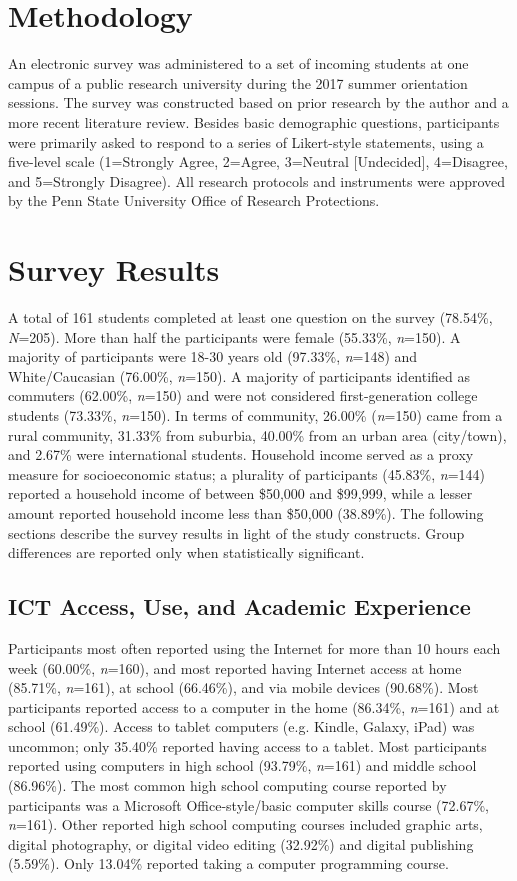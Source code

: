 \documentclass{article}
\begin{document}
\section{Methodology}
An electronic survey was administered to a set of incoming students at one campus of a public research university during the 2017 summer orientation sessions. The survey was constructed based on prior research by the author \cite{stone2010factors} and a more recent literature review. Besides basic demographic questions, participants were primarily asked to respond to a series of Likert-style statements, using a five-level scale (1=Strongly Agree, 2=Agree, 3=Neutral [Undecided], 4=Disagree, and 5=Strongly Disagree). All research protocols and instruments were approved by the Penn State University Office of Research Protections.

\section{Survey Results}
A total of 161 students completed at least one question on the survey (78.54\%, \textit{N}=205). More than half the participants were female (55.33\%, \textit{n}=150). A majority of participants were 18-30 years old (97.33\%, \textit{n}=148) and White/Caucasian (76.00\%, \textit{n}=150). A majority of participants identified as commuters (62.00\%, \textit{n}=150) and were not considered first-generation college students (73.33\%, \textit{n}=150). In terms of community, 26.00\% (\textit{n}=150) came from a rural community, 31.33\% from suburbia, 40.00\% from an urban area (city/town), and 2.67\% were international students. Household income served as a proxy measure for socioeconomic status; a plurality of participants (45.83\%, \textit{n}=144) reported a household income of between \$50,000 and \$99,999, while a lesser amount reported household income less than \$50,000 (38.89\%). The following sections describe the survey results in light of the study constructs. Group differences are reported only when statistically significant.

\subsection{ICT Access, Use, and Academic Experience}
Participants most often reported using the Internet for more than 10 hours each week (60.00\%, \textit{n}=160), and most reported having Internet access at home (85.71\%, \textit{n}=161), at school (66.46\%), and via mobile devices (90.68\%). Most participants reported access to a computer in the home (86.34\%, \textit{n}=161) and at school (61.49\%). Access to tablet computers (e.g. Kindle, Galaxy, iPad) was uncommon; only 35.40\% reported having access to a tablet. Most participants reported using computers in high school (93.79\%, \textit{n}=161) and middle school (86.96\%). The most common high school computing course reported by participants was a Microsoft Office-style/basic computer skills course (72.67\%, \textit{n}=161). Other reported high school computing courses included graphic arts, digital photography, or digital video editing (32.92\%) and digital publishing (5.59\%). Only 13.04\% reported taking a computer programming course.
\end{document}
